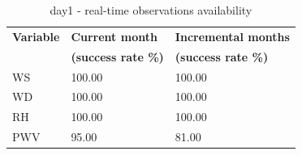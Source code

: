 \begin{table}[]
\begin{center}
\begin{tabular}{|l|l|l|}
\hline
\rowcolor[HTML]{C0C0C0} 
\textbf{Variable} & \textbf{Current month} & \textbf{Incremental months}\\
\rowcolor[HTML]{C0C0C0} 
              & \textbf{(success rate \%)} & \textbf{(success rate \%)}\\
\hline
WS                 & 100.00 & 100.00 \\
WD                 & 100.00 & 100.00 \\
RH                 & 100.00 & 100.00 \\
PWV                & 95.00 & 81.00 \\
\hline  
\end{tabular}
\caption{day1 - real-time observations availability}\label{tab:obs_ava_day}
\end{center}
\end{table}

